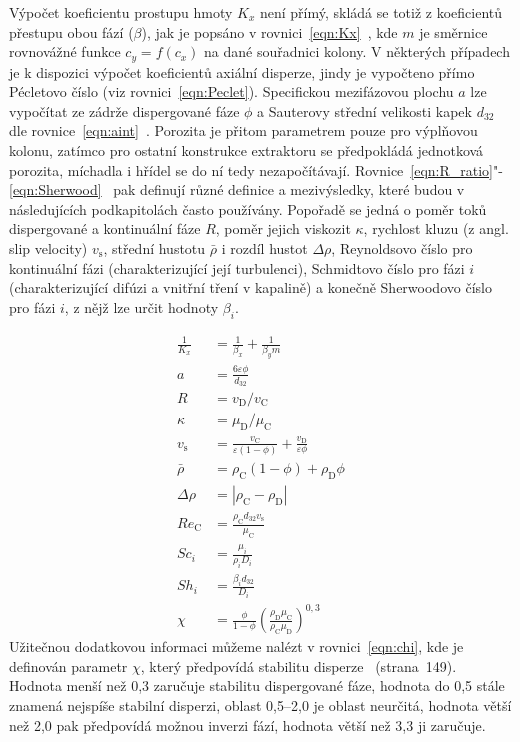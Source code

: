 Výpočet koeficientu prostupu hmoty $K_x$ není přímý, skládá se totiž z koeficientů přestupu obou fází ($\beta$), jak je popsáno v rovnici~\ref{eqn:Kx}~\cite{HartlandKumar1997}, kde $m$ je směrnice rovnovážné funkce $c_y = f(c_x)$ na dané souřadnici kolony.
V některých případech je k dispozici výpočet koeficientů axiální disperze, jindy je vypočteno přímo Pécletovo číslo (viz rovnici~\ref{eqn:Peclet}).
Specifickou mezifázovou plochu $a$ lze vypočítat ze zádrže dispergované fáze $\phi$ a Sauterovy střední velikosti kapek $d_{32}$ dle rovnice~\ref{eqn:aint}~\cite{HartlandKumar1997}.
Porozita je přitom parametrem pouze pro výplňovou kolonu, zatímco pro ostatní konstrukce extraktoru se předpokládá jednotková porozita, míchadla i hřídel se do ní tedy nezapočítávají.
Rovnice~\ref{eqn:R_ratio}"-\ref{eqn:Sherwood}~\cite{HartlandKumar1997} pak definují různé definice a mezivýsledky, které budou v následujících podkapitolách často používány.
Popořadě se jedná o poměr toků dispergované a kontinuální fáze $R$, poměr jejich viskozit $\kappa$, rychlost kluzu (z angl. slip velocity) $v_\mathrm{s}$, střední hustotu $\bar{\rho}$ i rozdíl hustot $\Delta\rho$, Reynoldsovo číslo pro kontinuální fázi (charakterizující její turbulenci), Schmidtovo číslo pro fázi $i$ (charakterizující difúzi a vnitřní tření v kapalině) a konečně Sherwoodovo číslo pro fázi $i$, z nějž lze určit hodnoty $\beta_i$.

\begin{align}
\label{eqn:Kx}
	\frac{1}{K_x} &= \frac{1}{\beta_x} + \frac{1}{ \beta_y m } \\
\label{eqn:aint}
	a &= \frac{6 \varepsilon \phi }{ d_{32} } \\
\label{eqn:R_ratio}
	R &= v_\mathrm{D} / v_\mathrm{C} \\
	\kappa &= \mu_\mathrm{D} / \mu_\mathrm{C} \\
\label{eqn:vSlipCalc}
	v_\mathrm{s} &= \frac{ v_\mathrm{C} }{ \varepsilon (1-\phi) } + \frac{ v_\mathrm{D} }{ \varepsilon \phi} \\
	\bar{\rho} &= \rho_\mathrm{C} (1-\phi) + \rho_\mathrm{D} \phi \\
	\Delta\rho &= |\rho_\mathrm{C} - \rho_\mathrm{D}| \\
	Re_\mathrm{C} &= \frac{ \rho_\mathrm{C} d_{32} v_\mathrm{s} }{ \mu_\mathrm{C} } \\
	Sc_i &= \frac{ \mu_i }{ \rho_i D_i } \\
\label{eqn:Sherwood}
	Sh_i &= \frac{ \beta_i d_{32} }{ D_i } \\
\label{eqn:chi}
	\chi &= \frac{\phi}{1 - \phi} \left(\frac{\rho_\mathrm{D} \mu_\mathrm{C} }{ \rho_\mathrm{C} \mu_\mathrm{D}}\right)^{0,3}
\end{align}
Užitečnou dodatkovou informaci můžeme nalézt v rovnici~\ref{eqn:chi}, kde je definován parametr $\chi$, který předpovídá stabilitu disperze~\cite{chi} (strana~149).
Hodnota menší než 0,3 zaručuje stabilitu dispergované fáze, hodnota do 0,5 stále znamená nejspíše stabilní disperzi, oblast 0,5--2,0 je oblast neurčitá, hodnota větší než 2,0 pak předpovídá možnou inverzi fází, hodnota větší než 3,3 ji zaručuje.

